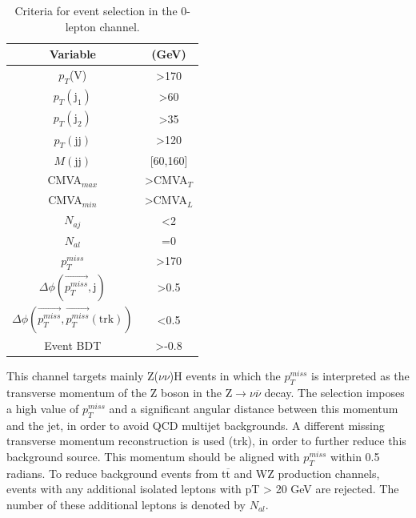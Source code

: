 \documentclass[EPJ,twocolumn]{webofc}
\begin{document}
\begin{table}[H]
    \centering
    \caption{Criteria for event selection in the 0-lepton channel.}
    \label{evt_selection}
    \begin{tabular}{c|c}
        \hline
        Variable & (GeV) \\ \hline
        $p_T$(V) & >170 \\
        $p_T(\text{j}_1)$ & >60 \\
        $p_T(\text{j}_2)$ & >35 \\
        $p_T(\text{jj})$ & >120 \\
        $M(\text{jj})$ & [60,160] \\
        CMVA$_{max}$ & >CMVA$_T$ \\
        CMVA$_{min}$ & >CMVA$_L$ \\
        $N_{aj}$ & <2 \\
        $N_{al}$ & =0 \\
        $p_T^{miss}$ & >170 \\
        $\Delta \phi (\vec{p_T^{miss}},\text{j})$ & >0.5 \\
        $\Delta \phi (\vec{p_T^{miss}},\vec{p_T^{miss}}(\text{trk}))$ & <0.5 \\
        Event BDT & >-0.8 \\\hline
    \end{tabular}
\end{table}

This channel targets mainly Z($\nu\nu$)H events in which the $p_T^{miss}$ is interpreted as the transverse
momentum of the Z boson in the $\text{Z} \rightarrow \nu\overline{\nu}$ decay. The selection imposes a high value of $p_T^{miss}$ and a significant angular distance between this momentum and the jet, in order to avoid QCD multijet backgrounds. A different missing transverse momentum reconstruction is used (trk), in order to further reduce this background source. This momentum should be aligned with $p_T^{miss}$ within 0.5 radians. To reduce background events from t$\overline{\text{t}}$ and WZ production channels, events with any additional isolated leptons with pT > 20 GeV are rejected. The number of these additional leptons is denoted by $N_{al}$.
\end{document}
